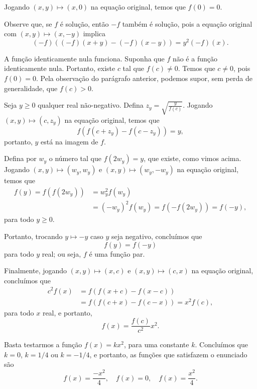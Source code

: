 \documentclass[10pt,a4paper]{scrartcl}
\begin{document}
	\begin{sol}
		Jogando \((x, y) \mapsto (x, 0)\) na equação original, temos que \(f(0) = 0\).

		Observe que, se \(f\) é solução, então \(-f\) também é solução, pois a equação original com \((x, y) \mapsto (x, -y)\) implica \[
			(-f)((-f)(x+y) - (-f)(x - y)) = y^2 (-f)(x).
		\]

		A função identicamente nula funciona. Suponha que \(f\) não é a função identicamente nula. Portanto, existe \(c\) tal que \(f(c) \neq 0\). Temos que \(c \neq 0\), pois \(f(0) = 0\). Pela observação do parágrafo anterior, podemos supor, sem perda de generalidade, que \(f(c) > 0\).

		Seja \(y \geq 0\) qualquer real não-negativo. Defina \(z_y = \sqrt{\frac{y}{f(c)}}\). Jogando \((x, y) \mapsto (c, z_y)\) na equação original, temos que \[
			f(f(c+z_y) - f(c-z_y)) = y,
		\] portanto, \(y\) está na imagem de \(f\).

		Defina por \(w_y\) o número tal que \(f(2w_y) = y\), que existe, como vimos acima. Jogando \((x, y) \mapsto (w_y, w_y)\) e \((x, y) \mapsto (w_y, -w_y)\) na equação original, temos que
		\begin{align*}
			f(y) = f(f(2w_y)) &= w_y^2f(w_y) \\
							  &= (-w_y)^2f(w_y) = f(-f(2w_y)) = f(-y),
		\end{align*}
		para todo \(y \geq 0\).

		Portanto, trocando \(y \mapsto -y\) caso \(y\) seja negativo, concluímos que \[
			f(y) = f(-y)
		\] para todo \(y\) real; ou seja, \(f\) é uma função par.

		Finalmente, jogando \((x, y) \mapsto (x, c)\) e \((x, y) \mapsto (c, x)\) na equação original, concluímos que 
		\begin{align*}
			c^2f(x) &= f(f(x+c) - f(x-c)) \\
					&= f(f(c+x) - f(c-x)) = x^2f(c),
		\end{align*}
		para todo \(x\) real, e portanto, \[
			f(x) = \frac{f(c)}{c^2}x^2.
		\]

		Basta testarmos a função \(f(x) = kx^2\), para uma constante \(k\). Concluímos que \(k = 0\), \(k = 1/4\) ou \(k = -1/4\), e portanto, as funções que satisfazem o enunciado são \[
			f(x) = \frac{-x^2}{4}, \quad f(x) = 0, \quad f(x) = \frac{x^2}{4}.
		\]
	\end{sol}
\end{document}
